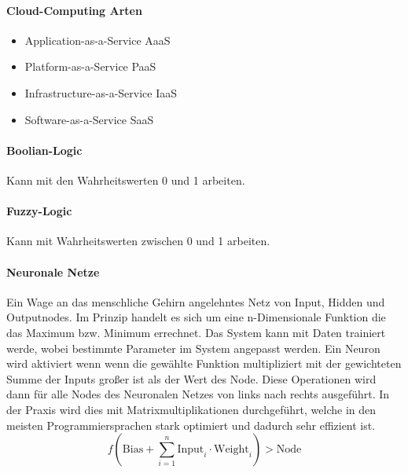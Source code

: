 \documentclass[twocolumn]{article}
\begin{document}
\paragraph{Cloud-Computing Arten}
	\begin{itemize}
		\item Application-as-a-Service AaaS
		\item Platform-as-a-Service PaaS
		\item Infrastructure-as-a-Service IaaS
		\item Software-as-a-Service SaaS
	\end{itemize}


\paragraph{Boolian-Logic}
	Kann mit den Wahrheitswerten 0 und 1 arbeiten.

\paragraph{Fuzzy-Logic}
	Kann mit Wahrheitswerten zwischen 0 und 1 arbeiten.

\paragraph{Neuronale Netze}
Ein Wage an das menschliche Gehirn angelehntes Netz von Input, Hidden und Outputnodes. Im Prinzip handelt es sich um eine n-Dimensionale Funktion die das Maximum bzw. Minimum errechnet. Das System kann mit Daten trainiert werde, wobei bestimmte Parameter im System angepasst werden. Ein Neuron wird aktiviert wenn wenn die gewählte Funktion multipliziert mit der gewichteten Summe der Inputs großer ist als der Wert des Node. Diese Operationen wird dann für alle Nodes des Neuronalen Netzes von links nach rechts ausgeführt. In der Praxis wird dies mit Matrixmultiplikationen durchgeführt, welche in den meisten Programmiersprachen stark optimiert und dadurch sehr effizient ist.
\begin{equation*}
f \left(\text{Bias} + \sum_{i=1}^{n} \text{Input}_i \cdot \text{Weight}_i \right) > \text{Node}
	\end{equation*}
	
\end{document}
